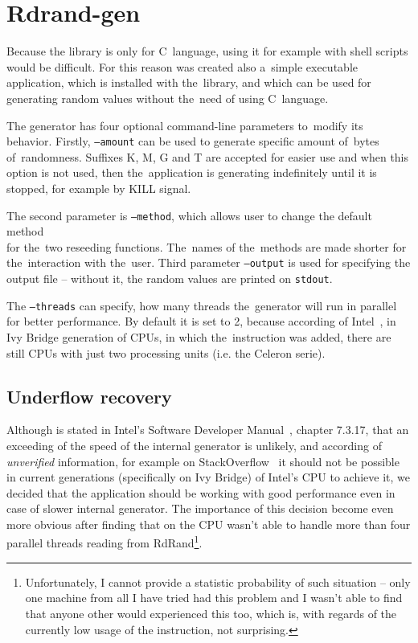 
\chapter{Rdrand-gen} \label{chap:generator}

Because the library is only for C~language, using it for example with shell scripts would be difficult. For this reason was created also a~simple executable application, which is installed with the~library, and which can be used for generating random values without the~need of using C~language.

The generator has four optional command-line parameters to~modify its behavior. Firstly, {\tt --amount} can be used to generate specific amount of~bytes of~randomness. Suffixes K, M, G and T are accepted for easier use and when this option is not used, then the~application is generating indefinitely until it is stopped, for example by KILL signal.

The second parameter is {\tt --method}, which allows user to change the default method \\ for the~two reseeding functions. The~names of the~methods are made shorter for the~interaction with the~user. Third parameter {\tt --output} is used for specifying the output file -- without it, the random values are printed on {\tt stdout}. 

The {\tt --threads} can specify, how many threads the~generator will run in parallel for better performance. By default it is set to 2, because according of Intel~\cite{IntelArk}, in Ivy Bridge generation of CPUs, in which the~instruction was added, there are still CPUs with just two processing units (i.e. the Celeron serie).


\section{Underflow recovery}
Although is stated in Intel's Software Developer Manual~\cite{IntelSWManualVol1}, chapter 7.3.17, that an exceeding of the speed of the internal generator is unlikely, and according of {\em unverified} information, for example on StackOverflow~\cite{StackoverflowRDRANDCharacteristics} it should not be possible in current generations (specifically on Ivy Bridge) of Intel's CPU to achieve it, we decided that the application should be working with good performance even in case of slower internal generator. The importance of this decision become even more obvious after finding that on  the CPU wasn't able to handle more than four parallel threads reading from RdRand\footnote{Unfortunately, I cannot provide a statistic probability of such situation -- only one machine from all I have tried had this problem and I wasn't able to find that anyone other would experienced this too, which is, with regards of the currently low usage of the instruction, not surprising.}.

